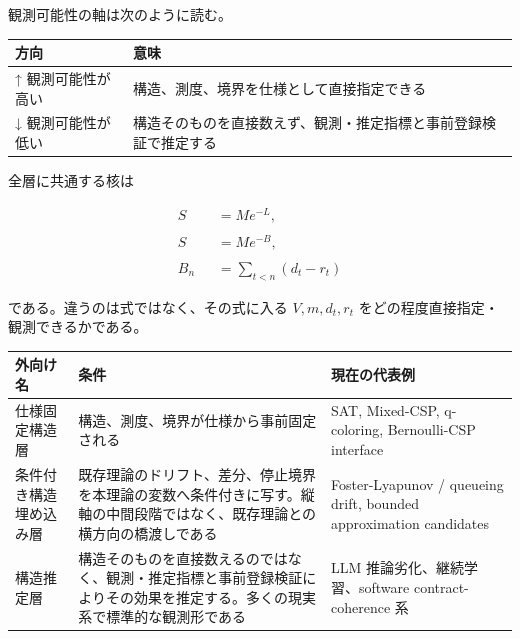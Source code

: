 \documentclass[12pt,a4paper]{article}
\begin{document}
観測可能性の軸は次のように読む。

{\def\LTcaptype{table} %
\begin{longtable}[]{@{}
  >{\raggedright\arraybackslash}p{}
  >{\raggedright\arraybackslash}p{}@{}}
\toprule\noalign{}
\begin{minipage}[b]{\linewidth}\raggedright
方向
\end{minipage} & \begin{minipage}[b]{\linewidth}\raggedright
意味
\end{minipage} \\
\midrule\noalign{}
\endhead
\bottomrule\noalign{}
\endlastfoot
↑ 観測可能性が高い & 構造、測度、境界を仕様として直接指定できる \\
↓ 観測可能性が低い & 構造そのものを直接数えず、観測・推定指標と事前登録検証で推定する \\
\end{longtable}
}

全層に共通する核は

\[
\begin{aligned}
S&=Me^{-L}, \\
\qquad \\
S&=Me^{-B}, \\
\qquad \\
B_{n}&=\sum_{t<n}(d_{t}-r_{t})
\end{aligned}
\]

である。違うのは式ではなく、その式に入る \(V,m,d_{t},r_{t}\) をどの程度直接指定・観測できるかである。

{\def\LTcaptype{table} %
\begin{longtable}[]{@{}
  >{\raggedright\arraybackslash}p{}
  >{\raggedright\arraybackslash}p{}
  >{\raggedright\arraybackslash}p{}@{}}
\toprule\noalign{}
\begin{minipage}[b]{\linewidth}\raggedright
外向け名
\end{minipage} & \begin{minipage}[b]{\linewidth}\raggedright
条件
\end{minipage} & \begin{minipage}[b]{\linewidth}\raggedright
現在の代表例
\end{minipage} \\
\midrule\noalign{}
\endhead
\bottomrule\noalign{}
\endlastfoot
仕様固定構造層 & 構造、測度、境界が仕様から事前固定される & SAT, Mixed-CSP, q-coloring, Bernoulli-CSP interface \\
条件付き構造埋め込み層 & 既存理論のドリフト、差分、停止境界を本理論の変数へ条件付きに写す。縦軸の中間段階ではなく、既存理論との横方向の橋渡しである & Foster-Lyapunov / queueing drift, bounded approximation candidates \\
構造推定層 & 構造そのものを直接数えるのではなく、観測・推定指標と事前登録検証によりその効果を推定する。多くの現実系で標準的な観測形である & LLM 推論劣化、継続学習、software contract-coherence 系 \\
\end{longtable}
}
\end{document}
